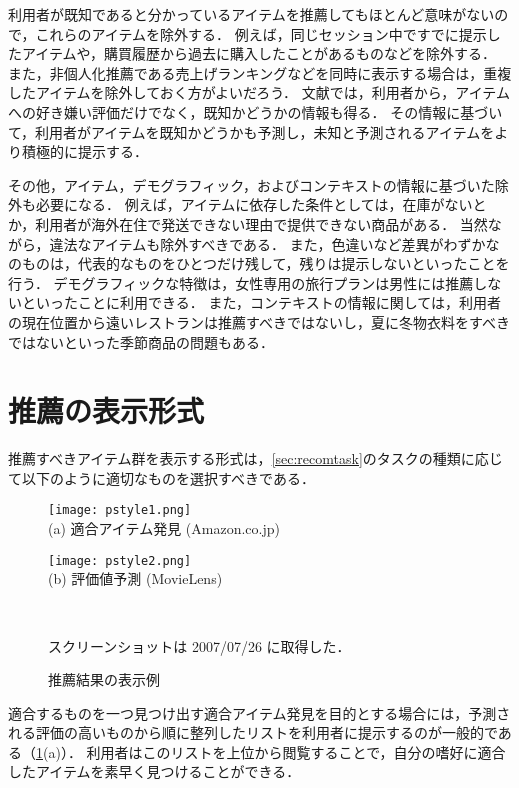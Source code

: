 利用者が既知であると分かっているアイテムを推薦してもほとんど意味がないので，これらのアイテムを除外する．
例えば，同じセッション中ですでに提示したアイテムや，購買履歴から過去に購入したことがあるものなどを除外する．
また，非個人化推薦である売上げランキングなどを同時に表示する場合は，重複したアイテムを除外しておく方がよいだろう．
文献\cite{trieice:07:03}では，利用者から，アイテムへの好き嫌い評価だけでなく，既知かどうかの情報も得る．
その情報に基づいて，利用者がアイテムを既知かどうかも予測し，未知と予測されるアイテムをより積極的に提示する．

その他，アイテム，デモグラフィック，およびコンテキストの情報に基づいた除外も必要になる．
例えば，アイテムに依存した条件としては，在庫がないとか，利用者が海外在住で発送できない理由で提供できない商品がある．
当然ながら，違法なアイテムも除外すべきである．
また，色違いなど差異がわずかなのものは，代表的なものをひとつだけ残して，残りは提示しないといったことを行う．
デモグラフィックな特徴は，女性専用の旅行プランは男性には推薦しないといったことに利用できる．
また，コンテキストの情報に関しては，利用者の現在位置から遠いレストランは推薦すべきではないし，夏に冬物衣料をすべきではないといった季節商品の問題もある．

\section{推薦の表示形式}
\label{sec:present:style}

推薦すべきアイテム群を表示する形式は，\ref{sec:recomtask}のタスクの種類に応じて以下のように適切なものを選択すべきである．

\begin{figure}
\centering
\begin{minipage}[t]{0.48\fullwidth}
\centering
\texttt{[image: pstyle1.png]}\\
(a) 適合アイテム発見 (Amazon.co.jp)
\end{minipage}
\hspace{0.02\fullwidth}
\begin{minipage}[t]{0.48\fullwidth}
\centering
\texttt{[image: pstyle2.png]}\\
(b) 評価値予測 (MovieLens\cite{url:008})
\end{minipage}\\
\caption{推薦結果の表示例}
\label{fig:presentation}
{\footnotesize スクリーンショットは 2007/07/26 に取得した．}
\end{figure}

適合するものを一つ見つけ出す適合アイテム発見を目的とする場合には，予測される評価の高いものから順に整列したリストを利用者に提示するのが一般的である（\ref{fig:presentation}(a)）．
利用者はこのリストを上位から閲覧することで，自分の嗜好に適合したアイテムを素早く見つけることができる．

